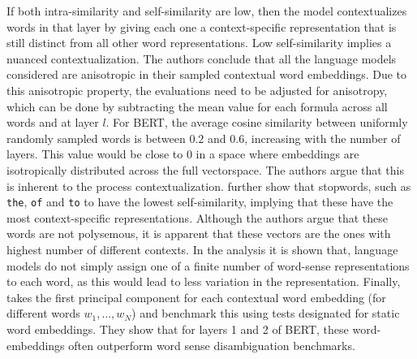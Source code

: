 \documentclass[a4paper,12pt,oneside,openright]{report}
\begin{document}

\quad

If both intra-similarity and self-similarity are low, then the model contextualizes words in that layer by giving each one a context-specific representation that is still distinct from all other word representations.
Low self-similarity implies a nuanced contextualization.
The authors conclude that all the language models considered are anisotropic in their sampled contextual word embeddings.
Due to this anisotropic property, the evaluations need to be adjusted for anisotropy, which can be done by subtracting the mean value for each formula across all words and at layer $l$. 
For BERT, the average cosine similarity between uniformly randomly sampled words is between $0.2$ and $0.6$, increasing with the number of layers.
This value would be close to 0 in a space where embeddings are isotropically distributed across the full vectorspace.
The authors argue that this is inherent to the process contextualization.
\cite{ethayarajh19} further show that stopwords, such as \texttt{the}, \texttt{of} and \texttt{to} to have the lowest self-similarity, implying that these have the most context-specific representations.
Although the authors argue that these words are not polysemous, it is apparent that these vectors are the ones with highest number of different contexts.
In the analysis it is shown that, language models do not simply assign one of a finite number of word-sense representations to each word, as this would lead to less variation in the representation.
Finally, \cite{ethayarajh19} takes the first principal component for each contextual word embedding (for different words $w_1, \ldots, w_N$) and benchmark this using tests designated for static word embeddings. 
They show that for layers 1 and 2 of BERT, these word-embeddings often outperform word sense disambiguation benchmarks.
\\
\end{document}
